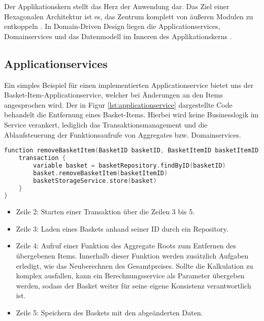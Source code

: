 Der Applikationskern stellt das Herz der Anwendung dar. Das Ziel einer Hexagonalen Architektur ist es, das Zentrum komplett von äußeren Modulen zu entkoppeln \cite{Cockburn.Hexagonal}. In Domain-Driven Design liegen die Applicationservices, Domainservices und das Datenmodell im Inneren des Applikationskerns \cite[S. 125ff.]{Vernon.2015}. 

\subsection{Applicationservices}

Ein simples Beispiel für einen implementierten Applicationservice bietet uns der Basket-Item-Applicationservice, welcher bei Änderungen an den Items angesprochen wird. Der in Figur \ref{lst:applicationservice} dargestellte Code behandelt die Entfernung eines Basket-Items. Hierbei wird keine Businesslogik im Service verankert, lediglich das Transaktionsmanagement und die Ablaufsteuerung der Funktionsaufrufe von Aggregates bzw. Domainservices.

\vspace{0.5cm}
\begin{minipage}{\linewidth} %
	\begin{lstlisting}[caption={Funktion zum Entfernen von Basket-Items in einem Applicationservice}, label={lst:applicationservice}, language=Kotlin]
function removeBasketItem(BasketID basketID, BasketItemID basketItemID) {
	transaction {
		variable basket = basketRepository.findByID(basketID)
		basket.removeBasketItem(basketItemID)
		basketStorageService.store(basket)
	}
}
	\end{lstlisting}

	\begin{itemize}
		\setlength\itemsep{-1pt}
		\item Zeile 2: Starten einer Transaktion über die Zeilen 3 bis 5.
		\item Zeile 3: Laden eines Baskets anhand seiner ID durch ein Repository. 
		\item Zeile 4: Aufruf einer Funktion des Aggregate Roots zum Entfernen des übergebenen Items. Innerhalb dieser Funktion werden zusätzlich Aufgaben erledigt, wie das Neuberechnen des Gesamtpreises. Sollte die Kalkulation zu komplex ausfallen, kann ein Berechnungsservice als Parameter übergeben werden, sodass der Basket weiter für seine eigene Konsistenz verantwortlich ist. 
		\item Zeile 5: Speichern des Baskets mit den abgeänderten Daten.
	\end{itemize}
\end{minipage}

